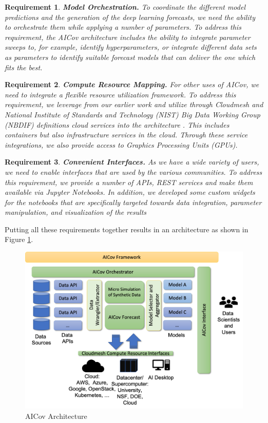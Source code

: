 \documentclass[letterpaper, inpress]{jds} %
\renewcommand{\_}{%
    \textunderscore\hspace{0pt}%
}
\newtheorem{requirement}{Requirement}
\begin{document}
\begin{requirement}{\bf Model Orchestration.}
  To coordinate the different model predictions and the generation of
  the deep learning forecasts, we need the ability to orchestrate them
  while applying a number of parameters. \Solution To address this
  requirement, the AICov architecture includes the ability to
  integrate parameter sweeps to, for example, identify
  hyperparameters, or integrate different data sets as parameters to
  identify suitable forecast models that can deliver the one which
  fits the best.
\end{requirement}

\begin{requirement}{\bf Compute Resource Mapping.}
  For other uses of AICov, we need to integrate a flexible resource
  utilization framework. \Solution To address this requirement, we
  leverage from our earlier work and utilize through Cloudmesh and
  National Institute of Standards and Technology (NIST) Big Data
  Working Group (NBDIF) definitions cloud services into the
  architecture \citep{las-19-nist}. This includes containers but also
  infrastructure services in the cloud. Through these service
  integrations, we also provide access to Graphics Processing Units
  (GPUs).
\end{requirement}

\begin{requirement}{\bf Convenient Interfaces.}
  As we have a wide variety of users, we need to enable interfaces
  that are used by the various communities. \Solution To address this
  requirement, we provide a number of APIs, REST services and make
  them available via Jupyter Notebooks. In addition, we developed some
  custom widgets for the notebooks that are specifically targeted
  towards data integration, parameter manipulation, and visualization
  of the results
\end{requirement}


Putting all these requirements together results in an architecture as
shown in Figure \ref{fig:arch}.\\

\begin{figure}[h!]
    \centering
    \includegraphics[width=0.6\columnwidth]{images/arch.pdf}
    \caption{AICov Architecture}
    \label{fig:arch}
\end{figure}
\end{document}
